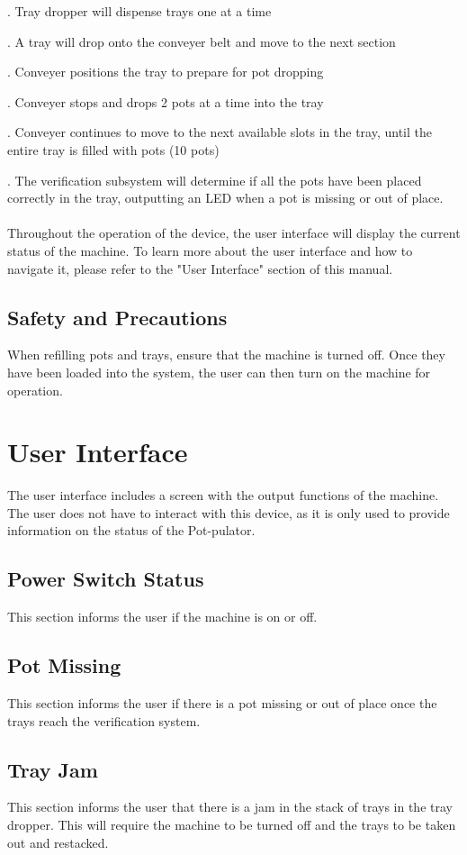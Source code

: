 \documentclass{article}
\begin{document}
 .	Tray dropper will dispense trays one at a time

 .	A tray will drop onto the conveyer belt and move to the next section

 .	Conveyer positions the tray to prepare for pot dropping

 .	Conveyer stops and drops 2 pots at a time into the tray

 .	Conveyer continues to move to the next available slots in the tray, until the entire tray is filled with pots (10 pots)

 .	The verification subsystem will determine if all the pots have been placed correctly in the tray, outputting an LED when a pot is missing or out of place. 
\\
\\ \noindent Throughout the operation of the device, the user interface will display the current status of the machine. To learn more about the user interface and how to navigate it, please refer to the "User Interface" section of this manual.
\subsection{Safety and Precautions}
When refilling pots and trays, ensure that the machine is turned off. Once they have been loaded into the system, the user can then turn on the machine for operation.
\section{User Interface}
The user interface includes a screen with the output functions of the machine. The user does not have to interact with this device, as it is only used to provide information on the status of the Pot-pulator.
\subsection{Power Switch Status}
This section informs the user if the machine is on or off.
\subsection{Pot Missing}
This section informs the user if there is a pot missing or out of place once the trays reach the verification system.
\subsection{Tray Jam}
This section informs the user that there is a jam in the stack of trays in the tray dropper. This will require the machine to be turned off and the trays to be taken out and restacked. 
\end{document}

